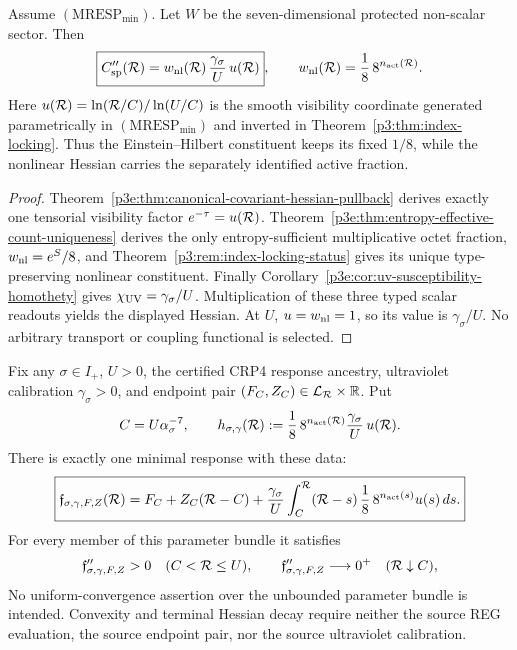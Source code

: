 \documentclass[12pt,a4paper]{article}
\begin{document}
\begin{lemma}
\label{p3:lem:protected-hessian-transport}
Assume \((\mathrm{MRESP}_{\min})\).  Let \(W\) be the seven-dimensional protected
non-scalar sector.  Then
\[
 \boxed{C_{\rm sp}''(\mathcal R)
 =w_{\rm nl}(\mathcal R)\,\frac{\gamma_\sigma}{U}\,u(\mathcal R)},
 \qquad
 w_{\rm nl}(\mathcal R)=\frac18\,8^{n_{\rm act}(\mathcal R)}.
\]
Here \(u(\mathcal R)=\ln(\mathcal R/C)/\ln(U/C)\) is the smooth visibility coordinate
generated parametrically in \((\mathrm{MRESP}_{\min})\) and inverted in
Theorem~\ref{p3:thm:index-locking}.  Thus the Einstein--Hilbert constituent
keeps its fixed \(1/8\), while the nonlinear Hessian carries the separately
identified active fraction.
\end{lemma}

\begin{proof}
Theorem~\ref{p3e:thm:canonical-covariant-hessian-pullback} derives exactly
one tensorial visibility factor
\(e^{-\tau}=u(\mathcal R)\).  Theorem~\ref{p3e:thm:entropy-effective-count-uniqueness}
derives the only entropy-sufficient multiplicative octet fraction,
\(w_{\rm nl}=e^S/8\), and
Theorem~\ref{p3:rem:index-locking-status} gives its unique type-preserving
nonlinear constituent.  Finally
Corollary~\ref{p3e:cor:uv-susceptibility-homothety} gives
\(\chi_{\rm UV}=\gamma_\sigma/U\).  Multiplication of these three typed scalar
readouts yields the displayed Hessian.  At \(U\), \(u=w_{\rm nl}=1\), so its
value is \(\gamma_\sigma/U\).  No arbitrary transport or coupling functional
 is selected.
\end{proof}

\begin{theorem}
\label{p3e:thm:complete-minimal-smooth-response-family}
Fix any \(\sigma\in I_+\), \(U>0\), the certified CRP4 response ancestry, ultraviolet calibration
\(\gamma_\sigma>0\), and endpoint pair
\((F_C,Z_C)\in\mathcal L_{\mathcal R}\times\mathbb R\).  Put
\[
 C=U\alpha_\sigma^{-7},\qquad
 h_{\sigma,\gamma}(\mathcal R)
 :=\frac18\,8^{n_{\rm act}(\mathcal R)}
   \frac{\gamma_\sigma}{U}\,u(\mathcal R).
\]
There is exactly one minimal response with these data:
\begin{equation}
\label{p3e:eq:complete-minimal-response-family}
 \boxed{\mathfrak f_{\sigma,\gamma,F,Z}(\mathcal R)
 =F_C+Z_C(\mathcal R-C)
 +\frac{\gamma_\sigma}{U}
  \int_C^\mathcal R(\mathcal R-s)\,
  \frac18\,8^{n_{\rm act}(s)}u(s)\,ds.}
\end{equation}
For every member of this parameter bundle it satisfies
\[
 \mathfrak f''_{\sigma,\gamma,F,Z}>0\quad(C<\mathcal R\le U),
 \qquad
 \mathfrak f''_{\sigma,\gamma,F,Z}\longrightarrow0^+
 \quad(\mathcal R\downarrow C),
\]
No uniform-convergence assertion over the unbounded parameter bundle is
intended.  Convexity and terminal Hessian decay require neither the source REG evaluation, the source endpoint
pair, nor the source ultraviolet calibration.
\end{theorem}
\end{document}
